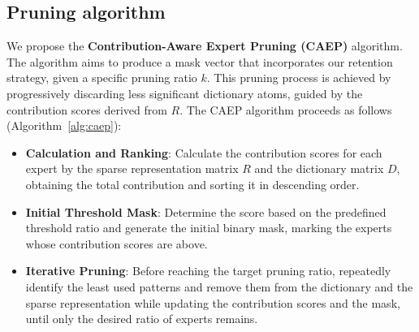 \documentclass[11pt]{article}
\begin{document}


\subsection{Pruning algorithm}
We propose the \textbf{Contribution-Aware Expert Pruning (CAEP)} algorithm. The algorithm aims to produce a mask vector that incorporates our retention strategy, given a specific pruning ratio \( k \). 
This pruning process is achieved by progressively discarding less significant dictionary atoms, guided by the contribution scores derived from \( R \). The CAEP algorithm proceeds as follows (Algorithm~\ref{alg:caep}):
\begin{itemize}[itemsep=-0.03em, parsep=-0.0pt]
    \item \textbf{Calculation and Ranking}: Calculate the contribution scores for each expert by the sparse representation matrix \( R \) and the dictionary matrix \( D \), obtaining the total contribution and sorting it in descending order.
    \item \textbf{Initial Threshold Mask}: Determine the score based on the predefined threshold ratio and generate the initial binary mask, marking the experts whose contribution scores are above.
    \item \textbf{Iterative Pruning}: Before reaching the target pruning ratio, repeatedly identify the least used patterns and remove them from the dictionary and the sparse representation while updating the contribution scores and the mask, until only the desired ratio of experts remains.
\end{itemize}
\end{document}
